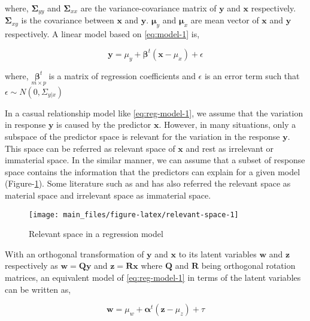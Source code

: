 \documentclass[12pt,3p,authoryear]{elsarticle}
\theoremstyle{definition}
\theoremstyle{definition}
\theoremstyle{definition}
\theoremstyle{remark}
\begin{document}
where, \(\boldsymbol{\Sigma}_{yy}\) and \(\boldsymbol{\Sigma}_{xx}\) are
the variance-covariance matrix of \(\mathbf{y}\) and \(\mathbf{x}\)
respectively. \(\boldsymbol{\Sigma}_{xy}\) is the covariance between
\(\mathbf{x}\) and \(\mathbf{y}\). \(\boldsymbol{\mu}_y\) and
\(\boldsymbol{\mu}_x\) are mean vector of \(\mathbf{x}\) and
\(\mathbf{y}\) respectively. A linear model based on \eqref{eq:model-1}
is,

\begin{equation}
\mathbf{y} = \mu_y + \boldsymbol{\beta}^t(\mathbf{x} - \mu_x) + \epsilon
\label{eq:reg-model-1}
\end{equation}

where, \(\underset{m\times p}{\boldsymbol{\beta}^t}\) is a matrix of
regression coefficients and \(\epsilon\) is an error term such that
\(\epsilon \sim N(0, \Sigma_{y|x})\)

In a casual relationship model like \eqref{eq:reg-model-1}, we assume that
the variation in response \(\mathbf{y}\) is caused by the predictor
\(\mathbf{x}\). However, in many situations, only a subspace of the
predictor space is relevant for the variation in the response
\(\mathbf{y}\). This space can be referred as relevant space of
\(\mathbf{x}\) and rest as irrelevant or immaterial space. In the
similar manner, we can assume that a subset of response space contains
the information that the predictors can explain for a given model
(Figure-\ref{fig:relevant-space}). Some literature such as
\citet{cook2010envelope} and \citet{cook2015simultaneous} has also
referred the relevant space as material space and irrelevant space as
immaterial space.

\begin{figure}

{\centering \texttt{[image: main\_files/figure-latex/relevant-space-1]} 

}

\caption{Relevant space in a regression model}\label{fig:relevant-space}
\end{figure}

With an orthogonal transformation of \(\mathbf{y}\) and \(\mathbf{x}\)
to its latent variables \(\mathbf{w}\) and \(\mathbf{z}\) respectively
as \(\mathbf{w=Qy}\) and \(\mathbf{z = Rx}\) where \(\mathbf{Q}\) and
\(\mathbf{R}\) being orthogonal rotation matrices, an equivalent model
of \eqref{eq:reg-model-1} in terms of the latent variables can be written
as,

\begin{equation}
\mathbf{w} = \mu_w + \boldsymbol{\alpha}^t(\mathbf{z} - \mu_z) + \tau
\label{eq:reg-model-2}
\end{equation}
\end{document}
